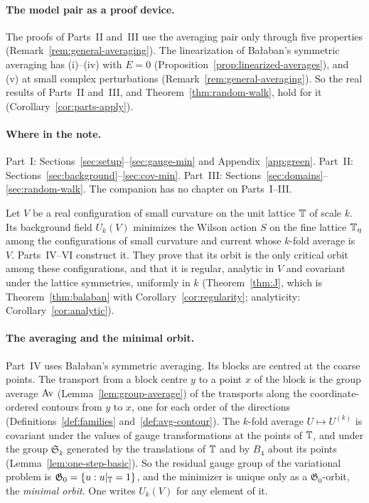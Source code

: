 \paragraph{The model pair as a proof device.} The proofs of Parts~II and~III use the averaging pair only through five properties (Remark~\ref{rem:general-averaging}). The linearization of Ba\l aban's symmetric averaging has (i)--(iv) with $E=0$ (Proposition~\ref{prop:linearized-averages}), and (v) at small complex perturbations (Remark~\ref{rem:general-averaging}). So the real results of Parts~II and~III, and Theorem~\ref{thm:random-walk}, hold for it (Corollary~\ref{cor:parts-apply}).

\paragraph{Where in the note.} Part~I: Sections~\ref{sec:setup}--\ref{sec:gauge-min} and Appendix~\ref{app:green}. Part~II: Sections~\ref{sec:background}--\ref{sec:cov-min}. Part~III: Sections~\ref{sec:domains}--\ref{sec:random-walk}. The companion has no chapter on Parts~I--III.

\label{g:background}

Let $V$ be a real configuration of small curvature on the unit lattice $\mathbb T$ of scale $k$. Its background field $U_k(V)$ minimizes the Wilson action $S$ on the fine lattice $\mathbb T_\eta$ among the configurations of small curvature and current whose $k$-fold average is $V$. Parts~IV--VI construct it. They prove that its orbit is the only critical orbit among these configurations, and that it is regular, analytic in $V$ and covariant under the lattice symmetries, uniformly in $k$ (Theorem~\ref{thm:J}, which is Theorem~\ref{thm:balaban} with Corollary~\ref{cor:regularity}; analyticity: Corollary~\ref{cor:analytic}).

\paragraph{The averaging and the minimal orbit.} Part~IV uses Ba\l aban's symmetric averaging. Its blocks are centred at the coarse points. The transport from a block centre $y$ to a point $x$ of the block is the group average $\operatorname{Av}$ (Lemma~\ref{lem:group-average}) of the transports along the coordinate-ordered contours from $y$ to $x$, one for each order of the directions (Definitions~\ref{def:families} and~\ref{def:avg-contour}). The $k$-fold average $U\mapsto U^{(k)}$ is covariant under the values of gauge transformations at the points of $\mathbb T$, and under the group $\mathfrak S_k$ generated by the translations of $\mathbb T$ and by $B_4$ about its points (Lemma~\ref{lem:one-step-basic}). So the residual gauge group of the variational problem is $\mathfrak G_0=\{u:u|_\mathbb T=1\}$, and the minimizer is unique only as a $\mathfrak G_0$-orbit, the \emph{minimal orbit}. One writes $U_k(V)$ for any element of it.

